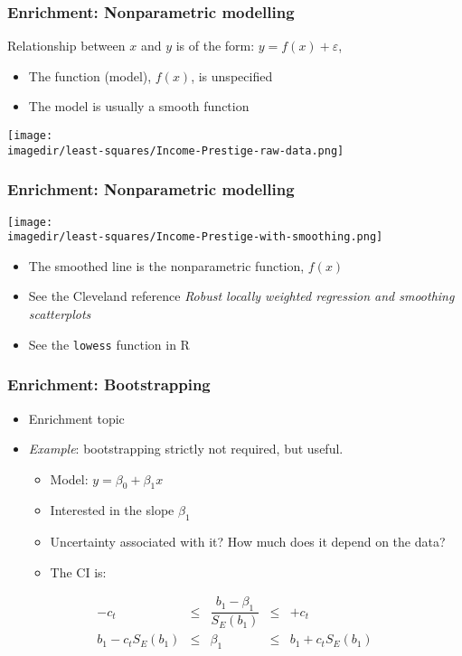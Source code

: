 \begin{frame}\frametitle{Enrichment: Nonparametric modelling}

	Relationship between $x$ and $y$ is of the form: $y = f(x) + \varepsilon$,
	\begin{itemize}
		\item	The function (model), $f(x)$, is unspecified
		\item	The model is usually a smooth function
	\end{itemize}
	\begin{center}
		\texttt{[image: \\imagedir/least-squares/Income-Prestige-raw-data.png]}
	\end{center}
\end{frame}

\begin{frame}\frametitle{Enrichment: Nonparametric modelling}
	\begin{center}
		\texttt{[image: \\imagedir/least-squares/Income-Prestige-with-smoothing.png]}
	\end{center}
	\begin{itemize}
		\item	The smoothed line is the nonparametric function, $f(x)$
		\item	See the Cleveland reference \emph{Robust locally weighted regression and smoothing scatterplots}
		\item	See the \texttt{lowess} function in R
	\end{itemize}
\end{frame}

\begin{frame}\frametitle{Enrichment: Bootstrapping}
	\begin{itemize}
		\item	Enrichment topic
		\item	\emph{Example}: bootstrapping strictly not required, but useful.
		\begin{itemize}
			\item	Model: $y = \beta_0 + \beta_1 x$
			\item	Interested in the slope $\beta_1$
			\item	Uncertainty associated with it? How much does it depend on the data?
			\item	The CI is:
		\end{itemize}
	\end{itemize}
	$$
	\begin{array}{rcccl}
		- c_t &\leq& \dfrac{b_1 - \beta_1}{S_E(b_1)} &\leq & +c_t\\
		b_1 - c_t S_E(b_1) &\leq& \beta_1 &\leq& b_1 + c_t S_E(b_1)
	\end{array}
	$$
\end{frame}

